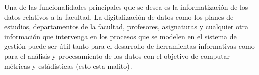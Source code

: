 \begin{recomendations}

Una de las funcionalidades principales que se desea es la informatización
de los datos relativos a la facultad. La digitalización de datos como 
los planes de estudios, departamentos de la facultad, profesores, asignaturas 
y cualquier otra información que intervenga en los procesos que se modelen en el sistema 
de gestión puede ser útil tanto para el desarrollo de herramientas informativas como
para el análisis y procesamiento de los datos con el objetivo de computar métricas y 
estádisticas (esto esta malito).


\end{recomendations}
